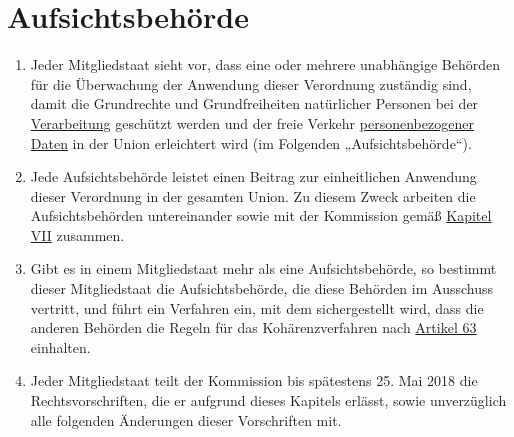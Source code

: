 \chapter{Aufsichtsbehörde}
\label{ch:51}


\begin{enumerate}

  \item Jeder Mitgliedstaat sieht vor, dass eine oder mehrere unabhängige Behörden für die Überwachung der Anwendung
   dieser Verordnung zuständig sind, damit die Grundrechte und Grundfreiheiten natürlicher Personen bei der
   \hyperref[itm:04-2]{Verarbeitung} geschützt werden und der freie Verkehr \hyperref[itm:04-1]{personenbezogener Daten} in der Union erleichtert wird
   (im Folgenden „Aufsichtsbehörde“).
  \label{itm:51-1}

  \item Jede Aufsichtsbehörde leistet einen Beitrag zur einheitlichen Anwendung dieser Verordnung in der gesamten Union.
   Zu diesem Zweck arbeiten die Aufsichtsbehörden untereinander sowie mit der Kommission gemäß \hyperref[part:7]
   {Kapitel VII} zusammen.
  \label{itm:51-2}

  \item Gibt es in einem Mitgliedstaat mehr als eine Aufsichtsbehörde, so bestimmt dieser Mitgliedstaat die
   Aufsichtsbehörde, die diese Behörden im Ausschuss vertritt, und führt ein Verfahren ein, mit dem sichergestellt
   wird, dass die anderen Behörden die Regeln für das Kohärenzverfahren nach \hyperref[ch:63]{Artikel 63} einhalten.
  \label{itm:51-3}

  \item Jeder Mitgliedstaat teilt der Kommission bis spätestens 25. Mai 2018 die Rechtsvorschriften, die er aufgrund
   dieses Kapitels erlässt, sowie unverzüglich alle folgenden Änderungen dieser Vorschriften mit.
  \label{itm:51-4}

\end{enumerate}


